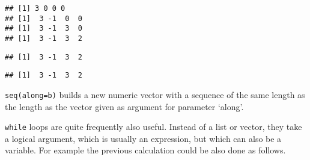 \documentclass[paper=a4,10pt,div=17,headsepline,BCOR=12mm,twoside,open=right]{scrbook}\usepackage{knitr}
\begin{document}
\begin{knitrout}\footnotesize
{}\color{fgcolor}\begin{kframe}
\begin{alltt}
 \hlkwb{<-} \hlstd{(}\hlopt{-}\hlstd{)}
  \hlstd{(}
   \hlkwb{<-} \hlstd{a[i}\hlopt{+}\hlstd{]} \hlopt{-} 
\hlstd{\}}
\end{alltt}
\begin{verbatim}
## [1] 3 0 0 0
## [1]  3 -1  0  0
## [1]  3 -1  3  0
## [1]  3 -1  3  2
\end{verbatim}
\begin{alltt}
 \hlkwb{<-} \hlstd{a[}\hlopt{:}\hlstd{(a)]} \hlopt{-} \hlstd{a[}\hlopt{:}\hlopt{-}\hlstd{]}
\end{alltt}
\begin{verbatim}
## [1]  3 -1  3  2
\end{verbatim}
\begin{alltt}
 \hlkwb{<-} 
\end{alltt}
\begin{verbatim}
## [1]  3 -1  3  2
\end{verbatim}
\end{kframe}
\end{knitrout}

\texttt{seq(along=b)} builds a new numeric vector with a sequence of the same length as the length as the vector given as argument for parameter `along'.

\texttt{while} loops are quite frequently also useful. Instead of a list or vector, they take a logical argument, which is usually an expression, but which can also be a variable. For example the previous calculation could be also done as follows.
\end{document}
